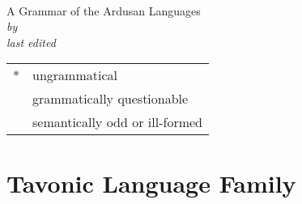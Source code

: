 \documentclass[12pt,letterpaper,openany,twoside]{memoir}
\title{\landn}
\author{Ian A.~Cook}
\date{\today}
\makeatletter
\let\originalpart=\part
\def\part{\cleardoublepage\originalpart}
\newcommand{\ungr}{*}
\newcommand{\ques}{\fakesuperscript{?}}
\newcommand{\excl}{\fakesuperscript{!}}
\newcommand{\landadj}{Ardusan}
\newcommand{\subtitle}{A Grammar of the \landadj{} Languages}
\newcommand{\Titlep}{%
	\begingroup
	\centering
	{\Huge \@title}\\[\baselineskip]
	{\LARGE\textsc \subtitle{}}\\[\baselineskip]
	{\Large\textit{by \@author}}\\
	\vfill
	\textit{last edited}\\
	{\large \@date}\par
	\endgroup
}
\makeatother
\begin{document}

\begin{titlingpage}
	\Titlep{}
	\clearpage
	
\end{titlingpage}


\frontmatter
{}\label{cha:toc}
\tableofcontents*
\clearpage
\listoffigures\label{cha:figures}
\clearpage
\listoftables\label{cha:tables}
\clearpage
\printglosses\label{cha:glossary}
\bigskip
\noindent\begin{tabular}{@{} l l}
\ungr & ungrammatical\\
\ques & grammatically questionable\\
\excl & semantically odd or ill-formed\\
\end{tabular}
\clearpage








\mainmatter

\part{Tavonic Language Family}
















\end{document}
